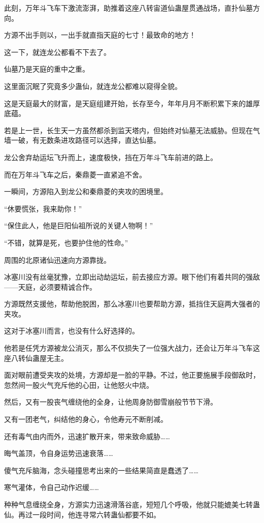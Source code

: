 \begin{this_body}
此刻，万年斗飞车下激流澎湃，助推着这座八转宙道仙蛊屋贯通战场，直扑仙墓方向。

方源不出手则以，一出手就直指天庭的七寸！最致命的地方！

这一下，就连龙公都看不下去了。

仙墓乃是天庭的重中之重。

这里面沉眠了究竟多少蛊仙，就连龙公都难以窥得全貌。

这是天庭最大的财富，是天庭组建开始，长存至今，年年月月不断积累下来的雄厚底蕴。

若是上一世，长生天一方虽然都杀到监天塔内，但始终对仙墓无法威胁。但现在气墙一破，有无数条进攻路径可以选择，直达仙墓。

龙公舍弃劫运坛飞升而上，速度极快，挡在万年斗飞车前进的路上。

而在万年斗飞车之后，秦鼎菱一直紧追不舍。

一瞬间，方源陷入到龙公和秦鼎菱的夹攻的困境里。

“休要慌张，我来助你！”

“保住此人，他是巨阳仙祖所说的关键人物啊！”

“不错，就算是死，也要护住他的性命。”

周围的北原诸仙迅速向方源靠拢。

冰塞川没有丝毫犹豫，立即出动劫运坛，前去接应方源。眼下他们有着共同的强敌——天庭，必须要精诚合作。

方源既然支援他，帮助他脱困，那么冰塞川也要帮助方源，抵挡住天庭两大强者的夹攻。

这对于冰塞川而言，也没有什么好选择的。

他若是任凭方源被龙公消灭，那么不仅损失了一位强大战力，还会让万年斗飞车这座八转仙蛊屋无主。

面对眼前遭受夹攻的处境，方源却是一脸的平静。不过，他正要施展手段御敌时，忽然间一股火气充斥他的心田，让他怒火中烧。

然后，又有一股丧气缠绕他的全身，让他周身防御雪崩般节节下滑。

又有一团老气，纠结他的身心，令他寿元不断削减。

还有毒气由内而外，迅速扩散开来，带来致命威胁……

晦气盖顶，令自身运势迅速衰落……

傻气充斥脑海，念头碰撞思考出来的一些结果简直是蠢透了……

寒气灌体，令自己动作迟缓……

种种气息缠绕全身，方源实力迅速滑落谷底，短短几个呼吸，他就只能媲美七转蛊仙。再过一段时间，他连寻常六转蛊仙都要不如。


\end{this_body}

